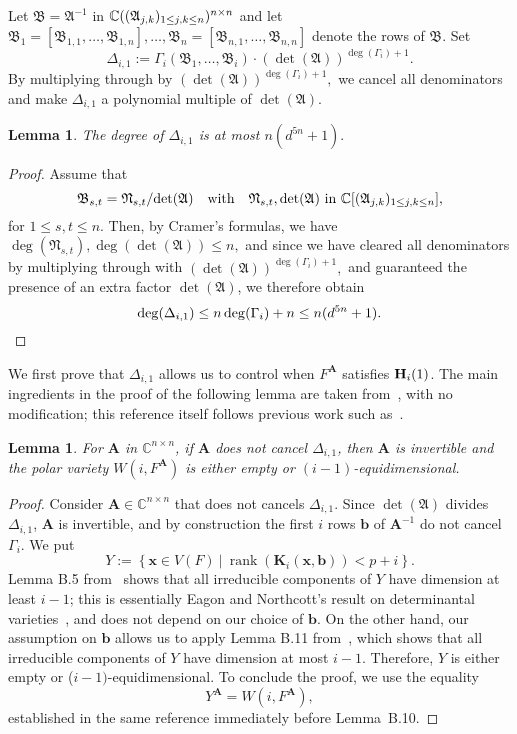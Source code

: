 \documentclass[12pt]{article}
\def\fB{{\mathfrak B}}
\def\fN{{\mathfrak N}}
\def\A{\mathfrak{A}}
\def\mA{{\bm A}}
\def\xb{{\bm x}}
\def\D{\Delta}
\DeclareMathOperator{\rk}{rank}
\def\C{\mathbb{C}}
\def\gi{\Gamma_i}
\newtheorem{lemma}[theorem]{Lemma}
\begin{document}
Let $\fB=\A^{-1}$ in $\C((\frak A_{j,k})_{1\le j,k \le n})^{n \times n}$ and let
$\fB_1=[\fB_{1,1},\hdots,\fB_{1,n}],\hdots,\fB_n=[\fB_{n,1},\hdots,\fB_{n,n}]$
denote the rows of $\fB.$ Set
\[
\Delta_{i,1} := \Gamma_i(\fB_1,\hdots,\fB_i)\cdot (\det( \A))^{\deg (\gi)+1}. 
\]
By multiplying through by $(\det( \A))^{\deg( \gi)+1},$ we cancel all
denominators and make $\D_{i,1}$ a polynomial multiple of $\det(\A)$.
\begin{lemma}
  The degree of $\Delta_{i,1}$ is at most $n(d^{5n}+1).$
\end{lemma}
\begin{proof}
  Assume that 
  \[
  \fB_{s,t}=\fN_{s,t}/{\rm det}(\A) \quad\text{with}\quad \fN_{s,t},\det(\A) \text{~in~} \C[(\frak A_{j,k})_{1\le j,k \le n}],
  \]
  for $1 \le s,t \le n$. Then, by Cramer's formulas, we have $\deg(
  \fN_{s,t}),\deg(\det(\A)) \leq n,$ and since we have cleared all
  denominators by multiplying through with $(\det( \A))^{\deg
    (\gi)+1},$ and guaranteed the presence of an extra factor
  $\det(\A)$, we therefore obtain
  \[
  \deg( \Delta_{i,1}) \leq n\deg( \gi) + n \leq n(d^{5n}+1). \qedhere
  \]
\end{proof}
We first prove that $\Delta_{i,1}$ allows us to control when $F^\mA$
satisfies ${\bf H}_i(1)$.  The main ingredients in the proof of the
following lemma are taken from~\cite{TWT}, with no modification;
this reference itself follows previous work such as~\cite{BaGiHeSaSh10}.
\begin{lemma}
  For $\mA$ in $\C^{n\times n}$, if $\mA$ does not cancel $\D_{i,1}$,
  then $\mA$ is invertible and the polar variety $W(i,F^\mA)$ is
  either empty or $(i-1)$-equidimensional.
\end{lemma}
\begin{proof}
  Consider $\bm A \in \C^{n \times n}$ that does not cancels
  $\D_{i,1}$.  Since $\det(\A)$ divides $\D_{i,1}$, $\bm A$ is
  invertible, and by construction the first $i$ rows $\bm b$ of $\bm
  A^{-1}$ do not cancel $\gi$. We put
  \[
  Y := \left\{\xb \in V(F)~|~\rk (\bm K_i(\bm x,\bm b)) < p+i\right\}. 
  \]
  Lemma B.5 from~\cite{TWT} shows that all irreducible components of
  $Y$ have dimension at least $i-1$; this is essentially Eagon and
  Northcott's result on determinantal varieties~\cite{EN62}, and does
  not depend on our choice of $\bm b$. On the other hand, our
  assumption on $\bm b$ allows us to apply Lemma B.11 from~\cite{TWT},
  which shows that all irreducible components of $Y$ have
  dimension at most $i-1$.  Therefore, $Y$ is either empty or
  ($i-1)$-equidimensional. To conclude the proof, we use the equality
  \[
  Y^{\mA} = W\left(i,F^{\mA}\right),
  \]
  established in the same reference immediately before Lemma~B.10.
\end{proof}
\end{document}
